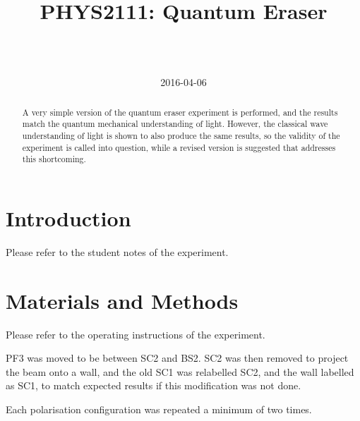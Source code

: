 \documentclass[a4paper]{scrartcl}
\begin{document}
\title{PHYS2111: Quantum Eraser}
\author{ \\ \\ }
\date{2016-04-06}
\maketitle

\begin{abstract}
    A very simple version of the quantum eraser experiment is performed, and the results match the quantum mechanical understanding of light. However, the classical wave understanding of light is shown to also produce the same results, so the validity of the experiment is called into question, while a revised version is suggested that addresses this shortcoming.
\end{abstract}

\section{Introduction}
Please refer to the student notes of the experiment.

\section{Materials and Methods}
Please refer to the operating instructions of the experiment.

PF3 was moved to be between SC2 and BS2. SC2 was then removed to project the beam onto a wall, and the old SC1 was relabelled SC2, and the wall labelled as SC1, to match expected results if this modification was not done.

Each polarisation configuration was repeated a minimum of two times.
\end{document}
